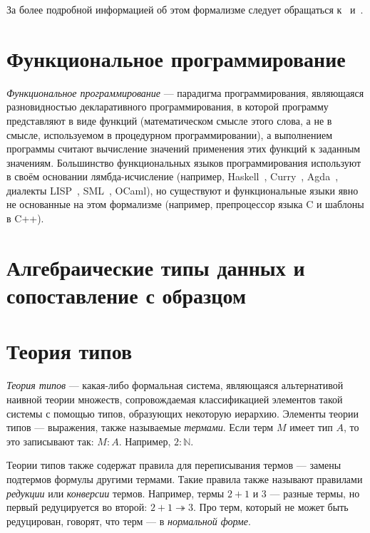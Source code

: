 За более подробной информацией об этом формализме следует обращаться к~\cite{TTFP} и~\cite{Sorensen}.

\section{Функциональное программирование}

\emph{Функциональное программирование} — парадигма программирования,
являющаяся разновидностью декларативного программирования,
в которой программу представляют в виде функций
(математическом смысле этого слова, а не в смысле, используемом в процедурном программировании),
а выполнением программы считают вычисление значений применения этих функций к заданным значениям.
Большинство функциональных языков программирования используют в своём основании лямбда-исчисление
(например, Haskell~\cite{TODO}, Curry~\cite{TODO}, Agda~\cite{TODO}, диалекты LISP~\cite{TODO,SICP}, SML~\cite{TODO}, OCaml\cite{TODO}),
но существуют и функциональные языки явно не основанные на этом формализме
(например, препроцессор языка C и шаблоны в C++).

\section{Алгебраические типы данных и сопоставление с образцом}

%

\section{Теория типов}

\emph{Теория типов} — какая-либо формальная система, являющаяся альтернативой
наивной теории множеств, сопровождаемая классификацией элементов такой системы
с помощью типов, образующих некоторую иерархию.
Элементы теории типов — выражения, также называемые \emph{термами}.
Если терм $ M $ имеет тип $A$, то это записывают так: $ M : A $.
Например, $ 2 : \mathbb{N} $.

Теории типов также содержат правила для переписывания термов — замены
подтермов формулы другими термами.
Такие правила также называют правилами \emph{редукции}
или \emph{конверсии} термов.
Например, термы $2 + 1$ и $3$ — разные термы, но первый редуцируется во второй:
$2 + 1 \twoheadrightarrow 3$.
Про терм, который не может быть редуцирован, говорят,
что терм — в \emph{нормальной форме}.

